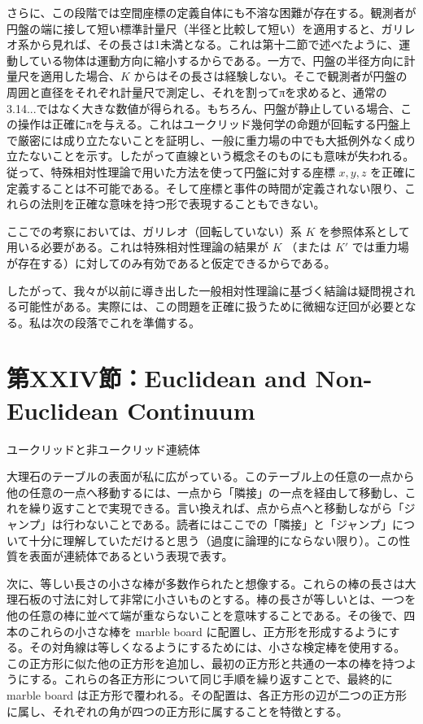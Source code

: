 \documentclass[a4paper,11pt,openany]{ltjsbook}
\begin{document}
さらに、この段階では空間座標の定義自体にも不溶な困難が存在する。観測者が円盤の端に接して短い標準計量尺（半径と比較して短い）を適用すると、ガリレオ系から見れば、その長さは1未満となる。これは第十二節で述べたように、運動している物体は運動方向に縮小するからである。一方で、円盤の半径方向に計量尺を適用した場合、$K$ からはその長さは経験しない。そこで観測者が円盤の周囲と直径をそれぞれ計量尺で測定し、それを割ってπを求めると、通常の3.14...ではなく大きな数値が得られる。もちろん、円盤が静止している場合、この操作は正確にπを与える。これはユークリッド幾何学の命題が回転する円盤上で厳密には成り立たないことを証明し、一般に重力場の中でも大抵例外なく成り立たないことを示す。したがって直線という概念そのものにも意味が失われる。従って、特殊相対性理論で用いた方法を使って円盤に対する座標 $x, y, z$ を正確に定義することは不可能である。そして座標と事件の時間が定義されない限り、これらの法則を正確な意味を持つ形で表現することもできない。

 ここでの考察においては、ガリレオ（回転していない）系 $K$ を参照体系として用いる必要がある。これは特殊相対性理論の結果が $K$ （または $K′$ では重力場が存在する）に対してのみ有効であると仮定できるからである。

したがって、我々が以前に導き出した一般相対性理論に基づく結論は疑問視される可能性がある。実際には、この問題を正確に扱うために微細な迂回が必要となる。私は次の段落でこれを準備する。


\clearpage
\chapter{第XXIV節：Euclidean and Non-Euclidean Continuum}

ユークリッドと非ユークリッド連続体

大理石のテーブルの表面が私に広がっている。このテーブル上の任意の一点から他の任意の一点へ移動するには、一点から「隣接」の一点を経由して移動し、これを繰り返すことで実現できる。言い換えれば、点から点へと移動しながら「ジャンプ」は行わないことである。読者にはここでの「隣接」と「ジャンプ」について十分に理解していただけると思う（過度に論理的にならない限り）。この性質を表面が連続体であるという表現で表す。

次に、等しい長さの小さな棒が多数作られたと想像する。これらの棒の長さは大理石板の寸法に対して非常に小さいものとする。棒の長さが等しいとは、一つを他の任意の棒に並べて端が重ならないことを意味することである。その後で、四本のこれらの小さな棒を marble board に配置し、正方形を形成するようにする。その対角線は等しくなるようにするためには、小さな検定棒を使用する。この正方形に似た他の正方形を追加し、最初の正方形と共通の一本の棒を持つようにする。これらの各正方形について同じ手順を繰り返すことで、最終的に marble board は正方形で覆われる。その配置は、各正方形の辺が二つの正方形に属し、それぞれの角が四つの正方形に属することを特徴とする。
\end{document}
